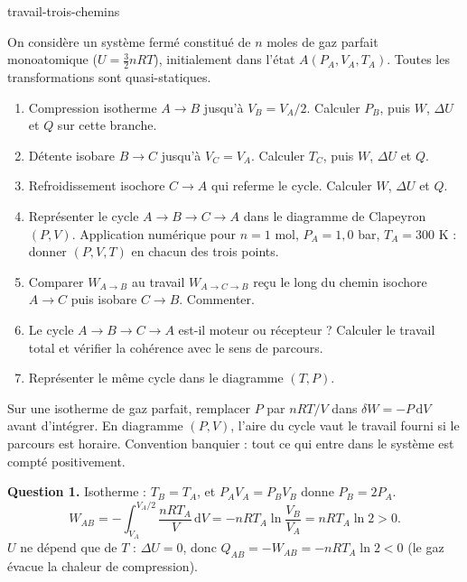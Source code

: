 
\begin{exo}{travail-trois-chemins}

On considère un système fermé constitué de $n$ moles de gaz parfait monoatomique ($U = \frac{3}{2}nRT$), initialement dans l'état $A(P_A, V_A, T_A)$. Toutes les transformations sont quasi-statiques.

\begin{enumerate}
\item Compression isotherme $A\to B$ jusqu'à $V_B = V_A/2$. Calculer $P_B$, puis $W$, $\Delta U$ et $Q$ sur cette branche.
\item Détente isobare $B\to C$ jusqu'à $V_C = V_A$. Calculer $T_C$, puis $W$, $\Delta U$ et $Q$.
\item Refroidissement isochore $C\to A$ qui referme le cycle. Calculer $W$, $\Delta U$ et $Q$.
\item Représenter le cycle $A\to B\to C\to A$ dans le diagramme de Clapeyron $(P,V)$. Application numérique pour $n = 1$ mol, $P_A = 1{,}0$ bar, $T_A = 300$ K : donner $(P,V,T)$ en chacun des trois points.
\item Comparer $W_{A\to B}$ au travail $W_{A\to C\to B}$ reçu le long du chemin isochore $A\to C$ puis isobare $C\to B$. Commenter.
\item Le cycle $A\to B\to C\to A$ est-il moteur ou récepteur ? Calculer le travail total et vérifier la cohérence avec le sens de parcours.
\item Représenter le même cycle dans le diagramme $(T,P)$.
\end{enumerate}

\begin{indication}
Sur une isotherme de gaz parfait, remplacer $P$ par $nRT/V$ dans $\delta W = -P\,\mathrm{d}V$ avant d'intégrer. En diagramme $(P,V)$, l'aire du cycle vaut le travail fourni si le parcours est horaire. Convention banquier : tout ce qui entre dans le système est compté positivement.
\end{indication}

\begin{solution}
\textbf{Question 1.} Isotherme : $T_B = T_A$, et $P_AV_A = P_BV_B$ donne $P_B = 2P_A$.
\[
W_{AB} = -\int_{V_A}^{V_A/2}\frac{nRT_A}{V}\,\mathrm{d}V = -nRT_A\ln\frac{V_B}{V_A} = nRT_A\ln 2 > 0.
\]
$U$ ne dépend que de $T$ : $\Delta U = 0$, donc $Q_{AB} = -W_{AB} = -nRT_A\ln 2 < 0$ (le gaz évacue la chaleur de compression).


\end{solution}
\end{exo}
